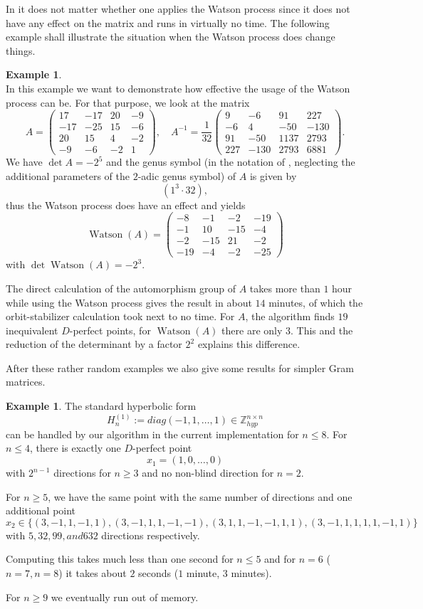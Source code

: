 \documentclass[10pt, preprint]{elsarticle}
\theoremstyle{definition}
\newtheorem{example}[theorem]{Example}
\theoremstyle{definition}
\newcommand{\Z}{\mathbb{Z}}
\newcommand{\Zhyp}{\Z^{n\times n}_{hyp}}
\newcommand{\Watson}{\operatorname{Watson}}
\begin{document}
In  it does not matter whether one applies the Watson process since it does not have any effect on the matrix and runs in virtually no time. The following example shall illustrate the situation when the Watson process does change things.
\begin{example}\label{exWatson}\mbox{}\\
In this example we want to demonstrate how effective the usage of the Watson process can be. For that purpose, we look at the matrix
\[A=\begin{pmatrix}
17 & -17 & 20 & -9 \\
-17 & -25 & 15 & -6 \\
20 & 15 & 4 & -2 \\
-9 & -6 & -2 & 1
\end{pmatrix}
,\quad 
A^{-1}=\frac{1}{32}\begin{pmatrix}
9 & -6 & 91 & 227 \\
-6 & 4 & -50 & -130 \\
91 & -50 & 1137 & 2793 \\
227 & -130 & 2793 & 6881
\end{pmatrix}
.
\]
We have $\det A=-2^5$ and the genus symbol (in the notation of \cite{CS}, neglecting the additional parameters of the $2$-adic genus symbol) of $A$ is given by
\[(1^3\cdot 32),\]
thus the Watson process does have an effect and yields
\[\Watson(A)=\begin{pmatrix}
-8 & -1 & -2 & -19 \\
-1 & 10 & -15 & -4 \\
-2 & -15 & 21 & -2 \\
-19 & -4 & -2 & -25
\end{pmatrix}
\]
with $\det \Watson(A)=-2^3$.

The direct calculation of the automorphism group of $A$ takes more than $1$ hour while using the Watson process gives the result in about $14$ minutes, of which the orbit-stabilizer calculation took next to no time. For $A$, the algorithm finds $19$ inequivalent $D$-perfect points, for $\Watson(A)$ there are only $3$. This and the reduction of the determinant by a factor $2^2$ explains this difference.
\end{example}
After these rather random examples we also give some results for simpler Gram matrices. 
\begin{example}
The standard hyperbolic form
\[H^{(1)}_n:=diag(-1,1,\dots ,1)\in\Zhyp\]
can be handled by our algorithm in the current implementation for $n\leq 8$. For $n\leq 4$, there is exactly one $D$-perfect point 
\[x_1=(1,0,\dots ,0)\]
with $2^{n-1}$ directions for $n\geq 3$ and no non-blind direction for $n=2$. 

For $n\geq 5$, we have the same point with the same number of directions and one additional point
\[x_2\in\{(3,-1,1,-1,1),(3,-1,1,1,-1,-1),(3,1,1,-1,-1,1,1),(3,-1,1,1,1,1,-1,1) \}\]
with $5,32,99, and 632$ directions respectively. 

Computing this takes much less than one second for $n\leq 5$ and for $n=6$ ($n=7,n=8$) it takes about $2$ seconds ($1$ minute, $3$ minutes). 

For $n\geq 9$ we eventually run out of memory.
\end{example}
\end{document}
